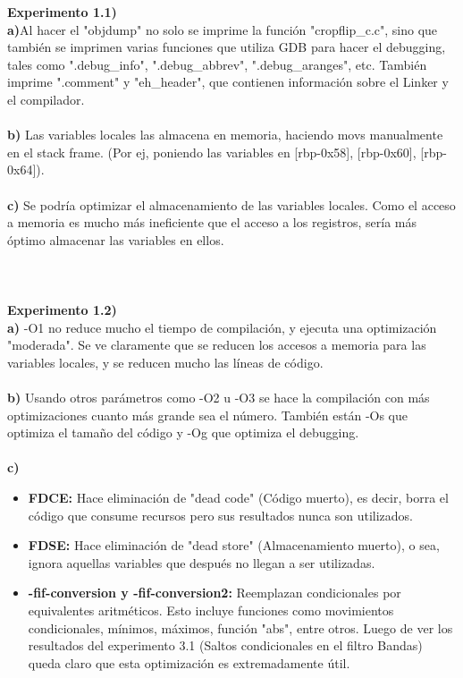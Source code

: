 \documentclass[a4paper]{article}
\begin{document}
\textbf{Experimento 1.1)}\\

\noindent \textbf{a)}Al hacer el "objdump" no solo se imprime la funci\'{o}n "cropflip\_c.c", sino que tambi\'{e}n se imprimen varias funciones que utiliza GDB para hacer el debugging, tales como ".debug\_info", ".debug\_abbrev", ".debug\_aranges", etc. Tambi\'{e}n imprime ".comment" y "eh\_header", que contienen informaci\'{o}n sobre el Linker y el compilador.\\ \\
 \textbf{b)} Las variables locales las almacena en memoria, haciendo movs manualmente en el stack frame. (Por ej, poniendo las variables en [rbp-0x58], [rbp-0x60], [rbp-0x64]).\\ \\
 \textbf{c)} Se podr\'{i}a optimizar el almacenamiento de las variables locales. Como el acceso a memoria es mucho m\'{a}s ineficiente que el acceso a los registros, ser\'{i}a más \'{o}ptimo almacenar las variables en ellos. \\ \\ \\ \\

\textbf{Experimento 1.2)}\\

\noindent \textbf{a)} -O1 no reduce mucho el tiempo de compilaci\'{o}n, y ejecuta una optimizaci\'{o}n "moderada". Se ve claramente que se reducen los accesos a memoria para las variables locales, y se reducen mucho las l\'{i}neas de c\'{o}digo.\\ \\
 \textbf{b)} Usando otros par\'{a}metros como -O2 u -O3 se hace la compilaci\'{o}n con más optimizaciones cuanto más grande sea el n\'{u}mero. Tambi\'{e}n est\'{a}n -Os que optimiza el tama\~{n}o del c\'{o}digo y -Og que optimiza el debugging.\\ \\



\noindent \textbf{c)}\\

\begin{itemize}

	\item \textbf{FDCE:} Hace eliminaci\'{o}n de "dead code" (C\'{o}digo muerto), es decir, borra el c\'{o}digo que consume recursos pero sus resultados nunca son utilizados.
	\item \textbf{FDSE:} Hace eliminaci\'{o}n de "dead store" (Almacenamiento muerto), o sea, ignora aquellas variables que despu\'{e}s no llegan a ser utilizadas. 
	\item \textbf{-fif-conversion y -fif-conversion2:} Reemplazan condicionales por equivalentes aritm\'{e}ticos. Esto incluye funciones como movimientos condicionales, m\'{i}nimos, m\'{a}ximos, funci\'{o}n "abs", entre otros. Luego de ver los resultados del experimento 3.1 (Saltos condicionales en el filtro Bandas) queda claro que esta optimizaci\'{o}n es extremadamente \'{u}til.

\end{itemize}
\end{document}
